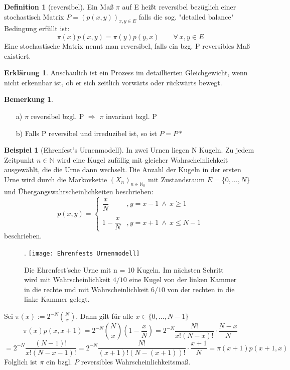 \documentclass[a4paper,12pt]{scrartcl}
\theoremstyle{definition}
\newtheorem{bem}{Bemerkung}[section]
\newtheorem{beti}{Erklärung}[section]
\newtheorem{bsp}{Beispiel}[section]
\newtheorem{defi}{Definition}[section]
\begin{document}
\begin{defi}[reversibel]
Ein Maß $\pi$ auf E heißt reversibel bezüglich einer stochastisch Matrix $P = (p(x,y))_{x,y \in E}$ falls die sog. "detailed balance" Bedingung erfüllt ist:
\begin{equation*}
\pi(x)p(x,y) = \pi(y)p(y,x) \qquad \forall \: x,y \in E
\end{equation*}
Eine stochastische Matrix nennt man reversibel, falls ein bzg. P reversibles Maß existiert.
\end{defi}
\begin{beti}
Anschaulich ist ein Prozess im detaillierten Gleichgewicht, wenn nicht erkennbar ist, ob er sich zeitlich vorwärts oder rückwärts bewegt.
\end{beti}
\begin{bem}
\mbox{}
\begin{itemize}
\item[a)]  $\pi$ reversibel bzgl. P $\Rightarrow$ $\pi$ invariant bzgl. P
\item[b)] Falls P reversibel und irreduzibel ist, so ist $P = P*$
\end{itemize}
\end{bem}
\begin{bsp}[Ehrenfest's Urnenmodell]
In zwei Urnen liegen N Kugeln. Zu jedem Zeitpunkt $n \in \mathbb{N}$ wird eine Kugel zufällig mit gleicher Wahrscheinlichkeit ausgewählt, die die Urne dann wechselt. Die Anzahl der Kugeln in der ersten Urne wird durch die Markovkette $(X_{n})_{n \in \mathbb{N}_{0}}$ mit Zustandsraum $E = \lbrace 0,...,N \rbrace$ und Übergangswahrscheinlichkeiten beschrieben:
\begin{equation*}
p(x,y)=
\begin{cases}
\dfrac{x}{N} & , y = x - 1 \: \wedge \: x \geq 1\\
 &  \\
1 - \dfrac{x}{N} & , y = x + 1 \: \wedge \: x \leq N - 1
\end{cases}
\end{equation*}
beschrieben.
\begin{figure}[H].
\centering
\texttt{[image: Ehrenfests Urnenmodell]}
\caption{Die Ehrenfest'sche Urne mit n = 10 Kugeln. Im nächsten Schritt wird mit Wahrscheinlichkeit $4/10$ eine Kugel von der linken Kammer in die rechte und mit Wahrscheinlichkeit $6/10$ von der rechten in die linke Kammer gelegt.}
\end{figure}
\noindent
Sei $\pi(x) := 2^{-N} \binom{N}{x}$. Dann gilt für alle $x \in \lbrace 0,...,N-1 \rbrace$
\begin{equation*}
\pi(x)p(x,x+1) =  2^{-N} \binom{N}{x} \left( 1 - \dfrac{x}{N} \right) = 2^{-N} \dfrac{N!}{x!(N-x)!} \cdot \dfrac{N-x}{N}
\end{equation*}
\begin{equation*}
= 2^{-N} \dfrac{(N-1)!}{x!(N-x-1)!} = 2^{-N} \dfrac{N!}{(x+1)!(N-(x+1))! } \cdot \dfrac{x+1}{N} = \pi(x+1)p(x+1,x)
\end{equation*}
Folglich ist $\pi$ ein bzgl. $P$ reversibles Wahrscheinlichkeitsmaß.
\end{bsp}
\end{document}
